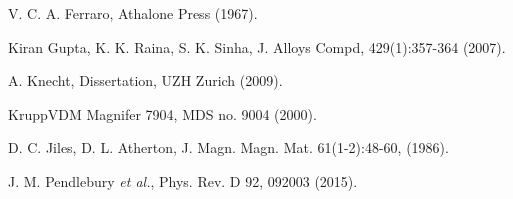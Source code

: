 \documentclass[review]{elsarticle}
\begin{document}
\begin{thebibliography}{00}
 V. C. A. Ferraro, Athalone Press (1967).

 Kiran Gupta, K. K. Raina, S. K. Sinha, J. Alloys Compd, 429(1):357-364 (2007).

 A. Knecht, Dissertation, UZH Zurich (2009).

 KruppVDM Magnifer 7904, MDS no. 9004 (2000).

 D. C. Jiles, D. L. Atherton,  J. Magn. Magn. Mat. 61(1-2):48-60, (1986).

 J. M. Pendlebury {\it et al.}, Phys. Rev. D 92, 092003 (2015).

\end{thebibliography}
\end{document}
